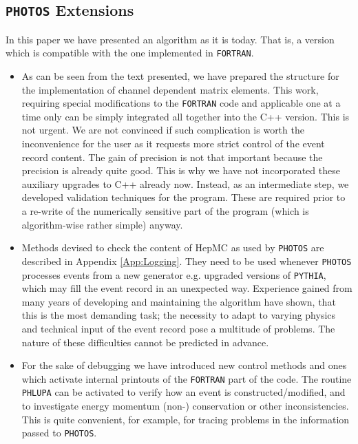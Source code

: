 \documentclass[]{Photos_interface_design}
\begin{document}
\subsection{{\tt PHOTOS} Extensions}
In this paper we have presented an algorithm as it is today. 
That is, a version which is compatible with the one implemented in {\tt FORTRAN}.

\begin{itemize}


\item
As can be seen from the text presented, we have prepared the structure 
for the implementation of channel dependent matrix elements. This work, requiring
special modifications to the {\tt FORTRAN} code and  applicable one at a time only can  
be simply integrated all together into the C++ version. This is not urgent.
 We are  not convinced if such complication is worth 
the inconvenience for the user as it requests more strict control of the event 
record content. The gain of precision is 
not that important because the precision is already quite good. 
This is why we have not incorporated  these auxiliary upgrades to C++ already now.
Instead, as an intermediate step, we developed validation techniques
for the program. These are required prior to a re-write of the
numerically sensitive part of the program (which is algorithm-wise
rather simple) anyway.

\item
Methods devised to check the content of HepMC as used by {\tt PHOTOS} are
described in Appendix \ref{App:Logging}. 
They need to be used whenever {\tt PHOTOS} 
processes events from a new generator e.g. upgraded versions of  {\tt PYTHIA},
which may fill the event record in an unexpected way.
Experience gained from many years of developing and maintaining the algorithm
have shown, that this is the most demanding task; the necessity to
adapt to varying physics and technical input of the event record pose
a multitude of problems. The nature of these difficulties cannot be
predicted in advance. 

\item
For the sake of debugging we have introduced new control methods 
and ones which activate
internal printouts of the {\tt FORTRAN} part of the code.
The routine {\tt PHLUPA} \cite{Barberio:1993qi} can be activated  to verify 
how an event is constructed/modified, and to investigate energy 
momentum (non-) conservation or other inconsistencies.
This is quite convenient, for example, for tracing problems in the
information passed to {\tt PHOTOS}.



\end{itemize}
\end{document}
